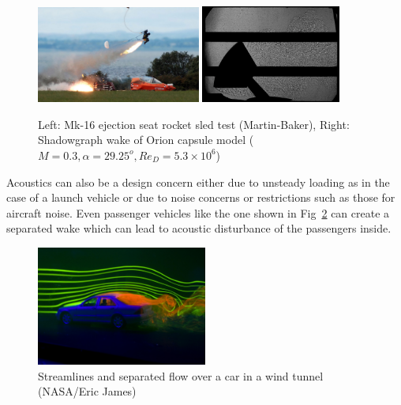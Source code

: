 \documentclass[journal]{new-aiaa}
\begin{document}
\begin{figure}[H]
\begin{center}
\includegraphics[width=0.48\textwidth]{Images/logan/martinbaker_EjectionSeat.jpg}
\includegraphics[width=0.41\textwidth]{Images/logan/ross2013comprehensive_CapsuleWakeShadowgraph.pdf}
\caption{ Left: Mk-16 ejection seat rocket sled test (Martin-Baker), Right: Shadowgraph wake of Orion capsule model ($M=0.3, \alpha=29.25^o, Re_D = 5.3\times10^6$) \cite{ross2013comprehensive}}
\label{fig:orionwakeandejectionseat}
\end{center}
\end{figure}



Acoustics can also be a design concern either due to unsteady loading as in the case of a launch vehicle or due to noise concerns or restrictions such as those for aircraft noise. Even passenger vehicles like the one shown in Fig~\ref{fig:carwake} can create a separated wake which can lead to acoustic disturbance of the passengers inside.

\begin{figure}[H]
\begin{center}
\includegraphics[width=0.5\textwidth]{Images/logan/james_CarWakePIV.jpg}
\caption{ Streamlines and separated flow over a car in a wind tunnel (NASA/Eric James) }
\label{fig:carwake}
\end{center}
\end{figure}
\end{document}
